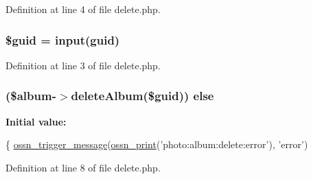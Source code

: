 Definition at line 4 of file delete.\+php.

\subsubsection[{\texorpdfstring{\$guid}{$guid}}]{\setlength{\rightskip}{0pt plus 5cm}\$guid = {\bf input}(\textquotesingle{}guid\textquotesingle{})}\hypertarget{components_2_ossn_photos_2actions_2album_2delete_8php_af99126304cbcb2e1483892c40bb3aae4}{}\label{components_2_ossn_photos_2actions_2album_2delete_8php_af99126304cbcb2e1483892c40bb3aae4}


Definition at line 3 of file delete.\+php.

\subsubsection[{\texorpdfstring{else}{else}}]{ (\$album-\/$>$delete\+Album(\$guid)) else}\hypertarget{components_2_ossn_photos_2actions_2album_2delete_8php_a242e3ffa377520d9729f18c93baa436d}{}\label{components_2_ossn_photos_2actions_2album_2delete_8php_a242e3ffa377520d9729f18c93baa436d}
{\bfseries Initial value\+:}
\begin{DoxyCode}
\{
        \hyperlink{ossn_8lib_8system_8php_ab3f23f23f32f50c12e7aea0ffaccaac7}{ossn\_trigger\_message}(\hyperlink{ossn_8lib_8languages_8php_a2be5d1c4b695593a9b9067b96df2150a}{ossn\_print}(\textcolor{stringliteral}{'photo:album:delete:error'}), \textcolor{stringliteral}{'error'})
\end{DoxyCode}


Definition at line 8 of file delete.\+php.

